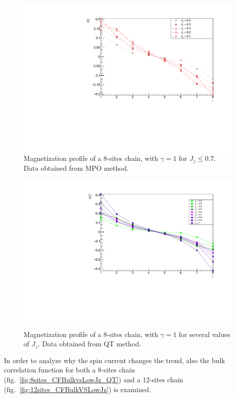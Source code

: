 \begin{figure}[H]
    \centering
    \includegraphics[scale=0.7]{Figures/8sites_LMvsLowJz.pdf}
    \caption{Magnetization profile of a 8-sites chain, with $\gamma = 1$ for $J_z \leq 0.7$. Data obtained from MPO method.}
    \label{fig:8sites_LMvsLowJz}
\end{figure}

\begin{figure}[H]
    \centering
    \includegraphics[scale=0.7]{Figures/8sites/8sites_LMvsJzQT.pdf}
    \caption{Magnetization profile of a 8-sites chain, with $\gamma = 1$ for several values of $J_z$. Data obtained from QT method.}
    \label{fig:8sites_LMvsJzQT}
\end{figure}

In order to analyze why the spin current changes the trend, also the bulk correlation function for both a 8-sites chain (fig.~\ref{fig:8sites_CFBulkvsLowJz_QT}) and a 12-sites chain (fig.~\ref{fig:12sites_CFBulkVSLowJz}) is examined.

